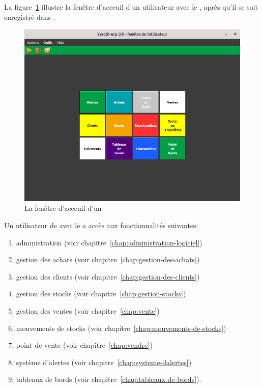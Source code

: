 \label{sec:utilisateurs-lepatron}

La figure~\ref{fig:yeren-fenetre-patron} illustre la fen\^etre
d'acceuil d'un utilisateur avec le \role \manager, 
apr\`es qu'il se soit enregistr\'e dans \yeren.\\

\begin{figure}[!htbp]
\centering
\includegraphics[scale=0.63]{images/yeroth-fenetre-manager.png}
\caption{La fen\^etre d'acceuil d'un \manager}
\label{fig:yeren-fenetre-patron}
\end{figure}

Un utilisateur de \yeren avec le \role \manager a acc\`es
aux fonctionnalit\'es suivantes:

\begin{enumerate}[1)]
	\item administration (voir chapitre~\ref{chap:administration-logiciel})
	\item gestion des achats (voir chapitre~\ref{chap:gestion-des-achats})
	\item gestion des clients (voir chapitre~\ref{chap:gestion-des-clients})
	\item gestion des stocks (voir chapitre~\ref{chap:gestion-stocks})
	\item gestion des ventes (voir chapitre~\ref{chap:vente})	
	\item mouvements de stocks (voir chapitre~\ref{chap:mouvements-de-stocks})
	\item point de vente (voir chapitre~\ref{chap:vendre})	
	\item syst\`eme d'alertes (voir chapitre~\ref{chap:systeme-dalertes})
	\item tableaux de bords (voir chapitre~\ref{chap:tableaux-de-bords}).\\
\end{enumerate}